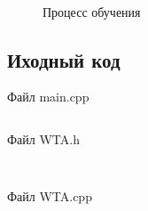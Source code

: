 \begin{figure}[H]
    \begin{minipage}[h]{0.47\linewidth}
          \\
    \end{minipage}
    \hfill
    \begin{minipage}[h]{0.47\linewidth}
         \\
    \end{minipage}
    \vfill
    \begin{minipage}[h]{0.47\linewidth}
         \\
    \end{minipage}
    \hfill
    \begin{minipage}[h]{0.47\linewidth}
         \\
    \end{minipage}
    \vfill
    \begin{minipage}[h]{0.47\linewidth}
          \\
    \end{minipage}
    \hfill
    \begin{minipage}[h]{0.47\linewidth}
         \\
    \end{minipage}
    \caption{Процесс обучения}
    \label{img:teaching}
\end{figure}


\subsection{Иходный код}
Файл main.cpp
\begin{verbatim}

\end{verbatim}

Файл WTA.h
\begin{verbatim}
     
\end{verbatim}

Файл WTA.cpp
\begin{verbatim}
    
\end{verbatim}
